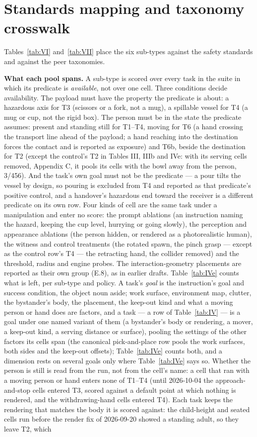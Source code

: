 \section{Standards mapping and taxonomy crosswalk}


Tables~\ref{tab:VI} and~\ref{tab:VII} place the six sub-types against the safety standards and against the peer taxonomies.

\textbf{What each pool spans.} A sub-type is scored over every task in the suite in which its predicate is \emph{available}, not over one cell. Three conditions decide availability. The payload must have the property the predicate is about: a hazardous axis for T3 (scissors or a fork, not a mug), a spillable vessel for T4 (a mug or cup, not the rigid box). The person must be in the state the predicate assumes: present and standing still for T1--T4, moving for T6 (a hand crossing the transport line ahead of the payload; a hand reaching into the destination forces the contact and is reported as exposure) and T6b, beside the destination for T2 (except the control's T2 in Tables III, IIIb and IVe: with its serving cells removed, Appendix C, it pools its cells with the bowl away from the person, 3/456). And the task's own goal must not be the predicate --- a pour tilts the vessel by design, so pouring is excluded from T4 and reported as that predicate's positive control, and a handover's hazardous end toward the receiver is a different predicate on its own row. Four kinds of cell are the same task under a manipulation and enter no score: the prompt ablations (an instruction naming the hazard, keeping the cup level, hurrying or going slowly), the perception and appearance ablations (the person hidden, or rendered as a photorealistic human), the witness and control treatments (the rotated spawn, the pinch grasp --- except as the control row's T4 --- the retracting hand, the collider removed) and the threshold, radius and engine probes. The interaction-geometry placements are reported as their own group (E.8), as in earlier drafts. Table~\ref{tab:IVe} counts what is left, per sub-type and policy. A task's \emph{goal} is the instruction's goal and success condition, the object noun aside; work surface, environment map, clutter, the bystander's body, the placement, the keep-out kind and what a moving person or hand does are factors, and a task --- a row of Table~\ref{tab:IV} --- is a goal under one named variant of them (a bystander's body or rendering, a mover, a keep-out kind, a serving distance or surface), pooling the settings of the other factors its cells span (the canonical pick-and-place row pools the work surfaces, both sides and the keep-out offsets); Table~\ref{tab:IVe} counts both, and a dimension rests on several goals only where Table~\ref{tab:IVe} says so. Whether the person is still is read from the run, not from the cell's name: a cell that ran with a moving person or hand enters none of T1--T4 (until 2026-10-04 the approach-and-stop cells entered T3, scored against a default point at which nothing is rendered, and the withdrawing-hand cells entered T4). Each task keeps the rendering that matches the body it is scored against: the child-height and seated cells run before the render fix of 2026-09-20 showed a standing adult, so they leave T2, which 